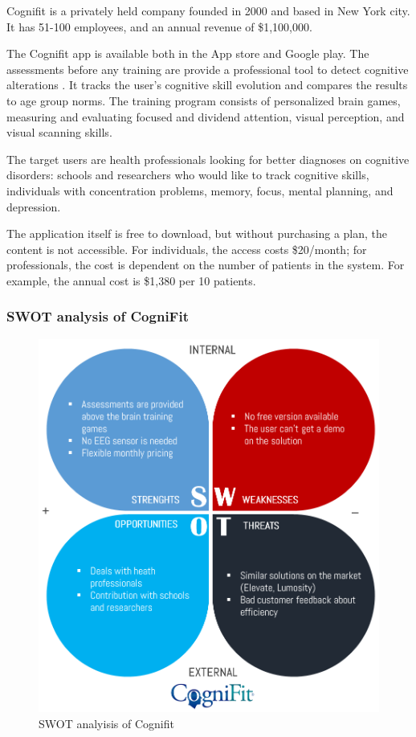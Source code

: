 \documentclass[letterpaper,10pt]{article}
\begin{document}
Cognifit is a privately held company founded in 2000 and based in New York city. It has 51-100 employees, and an annual revenue of \$1,100,000. \cite{mergent_intellect}


The Cognifit app is available both in the App store and Google play. The assessments before any training are provide a professional tool to detect cognitive alterations . It tracks the user’s cognitive skill evolution and compares the results to age group norms. The training program consists of personalized brain games, measuring and evaluating focused and dividend attention, visual perception, and visual scanning skills.

The target users are health professionals looking for better diagnoses on cognitive disorders: schools and researchers who would like to track cognitive skills, individuals with concentration problems, memory, focus, mental planning, and depression.

The application itself is free to download, but without purchasing a plan, the content is not accessible. For individuals, the access costs \$20/month; for professionals, the cost is dependent on the number of patients in the system. For example, the annual cost is \$1,380 per 10 patients.

\cite{cognifit}

\subsubsection{SWOT analysis of CogniFit}

\begin{figure}[h]
\centering
\includegraphics[scale=0.4]{cognifit_swot.PNG}
\caption{SWOT analyisis of Cognifit}
\label{img:cognifit_swot}
\end{figure}
\end{document}
